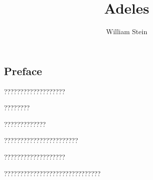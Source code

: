 \documentclass[11pt]{book}
\title{\Huge\bf\sc Adeles}
\author{William Stein}
\begin{document}
\maketitle
\newpage
\tableofcontents
\newpage

\begin{ch}
\chapter*{Preface}
???????????????????

????????

?????????????

???????????????????????

???????????????????

??????????????????????????????
\end{ch}
\end{document}
